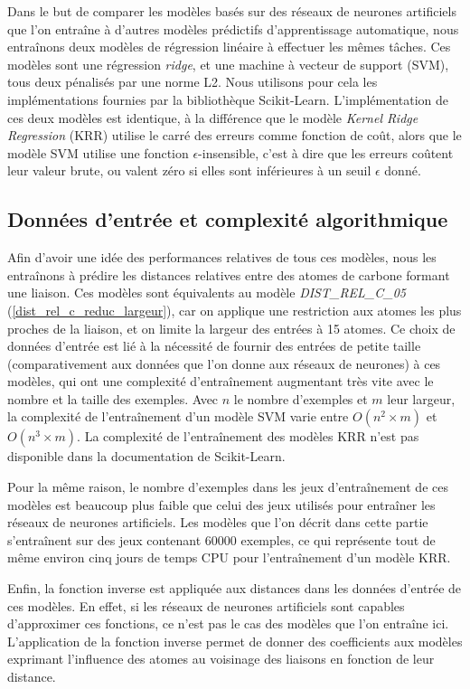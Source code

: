 \par Dans le but de comparer les modèles basés sur des réseaux de neurones artificiels que l'on entraîne à d'autres modèles prédictifs d'apprentissage automatique, nous entraînons deux modèles de régression linéaire à effectuer les mêmes tâches. Ces modèles sont une régression \emph{ridge}, et une machine à vecteur de support (SVM), tous deux pénalisés par une norme L2. Nous utilisons pour cela les implémentations fournies par la bibliothèque Scikit-Learn\cite{sklearn}. L'implémentation de ces deux modèles est identique, à la différence que le modèle \emph{Kernel Ridge Regression} (KRR) utilise le carré des erreurs comme fonction de coût, alors que le modèle SVM utilise une fonction $\epsilon$-insensible, c'est à dire que les erreurs coûtent leur valeur brute, ou valent zéro si elles sont inférieures à un seuil $\epsilon$ donné.
\\

\subsection{Données d'entrée et complexité algorithmique}

\par Afin d'avoir une idée des performances relatives de tous ces modèles, nous les entraînons à prédire les distances relatives entre des atomes de carbone formant une liaison. Ces modèles sont équivalents au modèle \emph{DIST\_REL\_C\_05} (\ref{dist_rel_c_reduc_largeur}), car on applique une restriction aux atomes les plus proches de la liaison, et on limite la largeur des entrées à 15 atomes. Ce choix de données d'entrée est lié à la nécessité de fournir des entrées de petite taille (comparativement aux données que l'on donne aux réseaux de neurones) à ces modèles, qui ont une complexité d'entraînement augmentant très vite avec le nombre et la taille des exemples. Avec $n$ le nombre d'exemples et $m$ leur largeur, la complexité de l'entraînement d'un modèle SVM varie entre $O(n^2\times m)$ et $O(n^3\times m)$. La complexité de l'entraînement des modèles KRR n'est pas disponible dans la documentation de Scikit-Learn.
\par Pour la même raison, le nombre d'exemples dans les jeux d'entraînement de ces modèles est beaucoup plus faible que celui des jeux utilisés pour entraîner les réseaux de neurones artificiels. Les modèles que l'on décrit dans cette partie s'entraînent sur des jeux contenant 60000 exemples, ce qui représente tout de même environ cinq jours de temps CPU pour l'entraînement d'un modèle KRR.
\par Enfin, la fonction inverse est appliquée aux distances dans les données d'entrée de ces modèles. En effet, si les réseaux de neurones artificiels sont capables d'approximer ces fonctions, ce n'est pas le cas des modèles que l'on entraîne ici. L'application de la fonction inverse permet de donner des coefficients aux modèles exprimant l'influence des atomes au voisinage des liaisons en fonction de leur distance.

